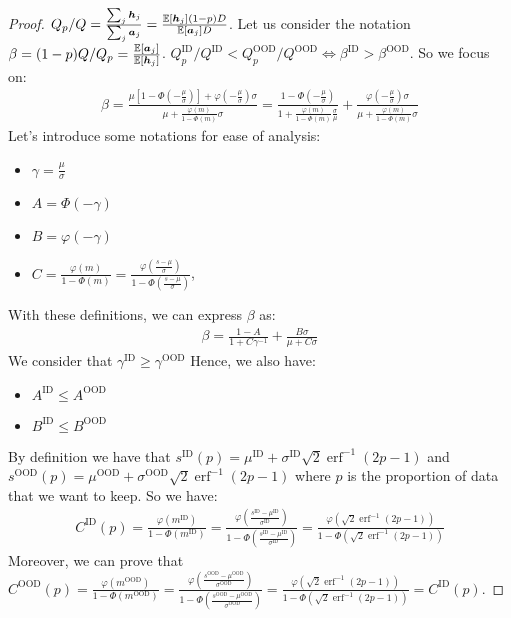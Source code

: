 \documentclass{article} %
\theoremstyle{plain}
\begin{document}
\begin{proof}
{$Q_p/Q=\frac{\sum_j{\bm{h}}_j}{\sum_j{\bm{a}}_j}=\frac{\mathbb{E}[{\bm{h}}_j](1-p)D}{\mathbb{E}[{\bm{a}}_j]D}$}.
Let us consider the notation $  \beta =(1-p)Q/Q_p=\frac{\mathbb{E}[{\bm{a}}_j] }{\mathbb{E}[{\bm{h}}_j]}$. $Q_p^{\text{ID}}/Q^{\text{ID}}<Q_p^{\text{OOD}}/Q^{\text{OOD}}\iff\beta^{\text{ID}}>\beta^{\text{OOD}}$. So we focus on:
\begin{align}
     \beta = \frac{ \mu \left[1- \Phi (-\frac{\mu}{\sigma}) \right] +\varphi (-\frac{\mu}{\sigma})\sigma  }{ \mu +{\frac{\varphi(m)}{1-\Phi(m)}}\sigma}= \frac{  1- \Phi (-\frac{\mu}{\sigma})    }{ 1 +{\frac{\varphi(m)}{1-\Phi(m)}}\frac{\sigma}{\mu}} +
\frac{  \varphi (-\frac{\mu}{\sigma})\sigma  }{ \mu +\frac{\varphi(m)}{1-\Phi(m)}\sigma}
\end{align}
Let's introduce some notations for ease of analysis:
\begin{itemize}
    \item $\gamma = \frac{\mu}{\sigma}$
    \item $A = \Phi(-\gamma)$
    \item $B = \varphi(-\gamma)$
    \item $C = \frac{\varphi(m)}{1-\Phi(m)} = \frac{\varphi(\frac{s-\mu}{\sigma})}{1-\Phi(\frac{s-\mu}{\sigma})}$, 
\end{itemize}
With these definitions, we can express $\beta$ as:
\begin{align}
 \beta = \frac{  1- A    }{ 1 +C\gamma^{-1}} +
\frac{  B\sigma  }{ \mu +C\sigma}
\end{align}
We consider that 
$\gamma^{\text{ID}} \geq \gamma^{\text{OOD}}$ 
Hence, we also have:
\begin{itemize}
    \item $A^{\text{ID}} \leq A^{\text{OOD}}$
    \item $B^{\text{ID}} \leq B^{\text{OOD}}$
\end{itemize}
By definition we have that
$ s^{\text{ID}}(p) = {\mu^{\text{ID}} +\sigma^{\text{ID}} {\sqrt {2}}\operatorname {erf} ^{-1}(2p-1)}$  and
$ s^{\text{OOD}}(p) = {\mu^{\text{OOD}} +\sigma^{\text{OOD}} {\sqrt {2}}\operatorname {erf} ^{-1}(2p-1)}$
where $p$ is the proportion of data that we want to keep. So we have:
\begin{align}
C^{\text{ID}}(p) = \frac{\varphi(m^{\text{ID}})}{1-\Phi(m^{\text{ID}})} = \frac{\varphi(\frac{s^{\text{ID}}-\mu^{\text{ID}}}{\sigma^{\text{ID}}})}{1-\Phi(\frac{s^{\text{ID}}-\mu^{\text{ID}}}{\sigma^{\text{ID}}})}= \frac{\varphi(\sqrt{2}\operatorname {erf} ^{-1}(2p-1))}{1-\Phi(\sqrt{2}\operatorname {erf} ^{-1}(2p-1))}
\end{align}
Moreover, we can prove that 
$    C^{\text{OOD}}(p)  = \frac{\varphi(m^{\text{OOD}})}{1-\Phi(m^{\text{OOD}})} = \frac{\varphi(\frac{s^{\text{OOD}}-\mu^{\text{OOD}}}{\sigma^{\text{OOD}}})}{1-\Phi(\frac{s^{\text{OOD}}-\mu^{\text{OOD}}}{\sigma^{\text{OOD}}})}= \frac{\varphi(\sqrt{2}\operatorname {erf} ^{-1}(2p-1))}{1-\Phi(\sqrt{2}\operatorname {erf} ^{-1}(2p-1))} =  C^{\text{ID}}(p) $.


\end{proof}
\end{document}
